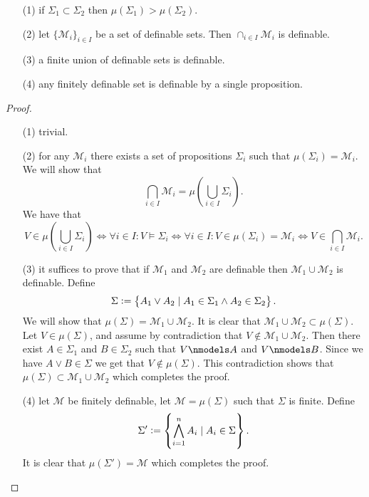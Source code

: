 \documentclass[11pt,a4paper]{article}
\begin{document}
  \begin{proposition}
    \begin{enumerate}
      \item[(1)] if $\Sigma_1 \subset \Sigma_2$ then
        $\mu(\Sigma_1) > \mu(\Sigma_2)$.
      \item[(2)] let $\{\mathcal M_i\}_{i \in I}$ be a set of definable sets.
        Then $\cap_{i \in I} \mathcal M_i$ is definable.
      \item[(3)] a finite union of definable sets is definable.
      \item[(4)] any finitely definable set is definable by a single
        proposition.
    \end{enumerate}
  \end{proposition}
  \begin{proof}
    \begin{enumerate}
      \item[(1)] trivial.
      \item[(2)] for any $\mathcal M_i$ there exists a set of propositions
        $\Sigma_i$ such that $\mu(\Sigma_i) = \mathcal M_i$.
        We will show that
        \[
          \bigcap_{i \in I} \mathcal M_i =
          \mu\left(\bigcup_{i \in I} \Sigma_i\right).
        \]
        We have that
        \[
          V \in \mu\left(\bigcup_{i \in I} \Sigma_i\right) \iff
          \forall i \in I \colon V \models \Sigma_i \iff
          \forall i \in I \colon V \in \mu(\Sigma_i) = \mathcal M_i \iff
          V \in \bigcap_{i \in I} \mathcal M_i.
        \]
      \item[(3)] it suffices to prove that if $\mathcal M_1$ and
        $\mathcal M_2$ are definable then $\mathcal M_1 \cup \mathcal M_2$
        is definable. Define
        \[
          \Sigma := \set{A_1 \lor A_2 \mid A_1 \in \Sigma_1 \land A_2 \in \Sigma_2}.
        \]
        We will show that $\mu(\Sigma) = \mathcal M_1 \cup \mathcal M_2$.
        It is clear that $\mathcal M_1 \cup \mathcal M_2 \subset \mu(\Sigma)$.
        Let $V \in \mu(\Sigma)$, and assume by contradiction that
        $V \notin \mathcal M_1 \cup \mathcal M_2$.
        Then there exist $A \in \Sigma_1$ and $B \in \Sigma_2$ such that
        $V \nmodels A$ and $V \nmodels B$.
        Since we have $A \lor B \in \Sigma$ we get that $V \notin \mu(\Sigma)$.
        This contradiction shows that
        $\mu(\Sigma) \subset \mathcal M_1 \cup \mathcal M_2$
        which completes the proof.
      \item[(4)] let $\mathcal M$ be finitely definable, let 
        $\mathcal M = \mu(\Sigma)$ such that $\Sigma$ is finite.
        Define
        \[
          \Sigma' := \set{\bigwedge_{i=1}^{n} A_i \mid A_i \in \Sigma}.
        \]
        It is clear that $\mu(\Sigma') = \mathcal M$ which completes the
        proof.
    \end{enumerate}
  \end{proof}
\end{document}

